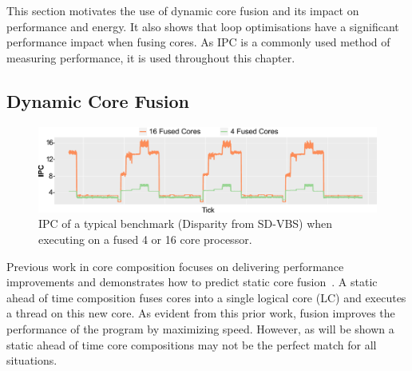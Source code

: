This section motivates the use of dynamic core fusion and its impact on performance and energy.
It also shows that loop optimisations have a significant performance impact when fusing cores.
As IPC is a commonly used method of measuring performance, it is used throughout this chapter.

\subsection{Dynamic Core Fusion}
\begin{figure}[t]
    \centering
    \includegraphics[width=\textwidth]{cases-paper/graphics/motivation/disp_opt_4_16_3.pdf}
    \caption{IPC of a typical benchmark (Disparity from SD-VBS) when executing on a fused 4 or 16 core processor.} 
    \label{fig:disp_ex}
\end{figure}





Previous work in core composition focuses on delivering performance improvements \cite{ipek2007CoreFusion,kim2007tflex} and demonstrates how to predict static core fusion~\cite{micolet2016dmpstream}.
A static ahead of time composition fuses cores into a single logical core (LC) and executes a thread on this new core.
As evident from this prior work, fusion improves the performance of the program by maximizing speed.
However, as will be shown a static ahead of time core compositions may not be the perfect match for all situations.

